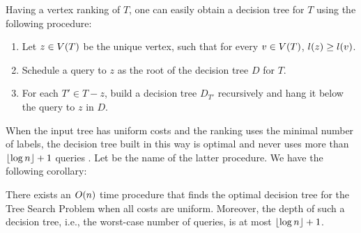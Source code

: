 Having a vertex ranking of $T$, one can easily obtain a decision tree for $T$ using the following procedure:
\begin{enumerate}
    \item Let $z\in V\mathopen{}\left( T \right)$ be the unique vertex, such that for every $v\in V\mathopen{}\left( T \right)$, $l\mathopen{}\left( z \right)\geq l\mathopen{}\left( v \right)$.
    \item Schedule a query to $z$ as the root of the decision tree $D$ for $T$.
    \item For each $T'\in T-z$, build a decision tree $D_{T'}$ recursively and hang it below the query to $z$ in $D$.
\end{enumerate} 

When the input tree has uniform costs and the ranking uses the minimal number of labels, the decision tree built in this way is optimal and never uses more than $\mathopen{}\left\lfloor \log n \right\rfloor + 1$ queries \cite{OnakParys2006GenOfBSSInTsAndFLikePosets}. Let \FRankingBasedDT be the name of the latter procedure. We have the following corollary:
  
\begin{corollary}\label{vertexRankingCorollary}
    There exists an $O\mathopen{}\left( n \right)$ time procedure \FRankingBasedDT that finds the optimal decision tree for the Tree Search Problem when all costs are uniform. Moreover, the depth of such a decision tree, i.e., the worst-case number of queries, is at most $\mathopen{}\left\lfloor \log n \right\rfloor + 1$.
\end{corollary}










